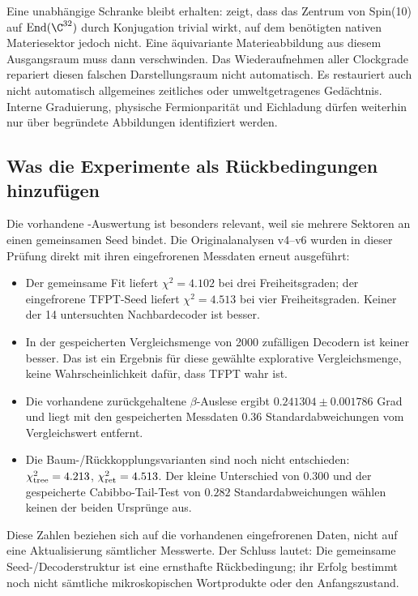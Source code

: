Eine unabhängige Schranke bleibt erhalten:  zeigt, dass das Zentrum von Spin(10) auf $\operatorname{End}(\C^{32})$ durch Konjugation trivial wirkt, auf dem benötigten nativen Materiesektor jedoch nicht. Eine äquivariante Materieabbildung aus diesem Ausgangsraum muss dann verschwinden. Das Wiederaufnehmen aller Clockgrade repariert diesen falschen Darstellungsraum nicht automatisch. Es restauriert auch nicht automatisch allgemeines zeitliches oder umweltgetragenes Gedächtnis. Interne Graduierung, physische Fermionparität und Eichladung dürfen weiterhin nur über begründete Abbildungen identifiziert werden.

\subsection*{Was die Experimente als Rückbedingungen hinzufügen}
Die vorhandene -Auswertung ist besonders relevant, weil sie mehrere Sektoren an einen gemeinsamen Seed bindet. Die Originalanalysen v4--v6 wurden in dieser Prüfung direkt mit ihren eingefrorenen Messdaten erneut ausgeführt:
\begin{itemize}
\item Der gemeinsame Fit liefert $\chi^2=4.102$ bei drei Freiheitsgraden; der eingefrorene TFPT-Seed liefert $\chi^2=4.513$ bei vier Freiheitsgraden. Keiner der 14 untersuchten Nachbardecoder ist besser.
\item In der gespeicherten Vergleichsmenge von 2000 zufälligen Decodern ist keiner besser. Das ist ein Ergebnis für diese gewählte explorative Vergleichsmenge, keine Wahrscheinlichkeit dafür, dass TFPT wahr ist.
\item Die vorhandene zurückgehaltene $\beta$-Auslese ergibt $0.241304\pm0.001786$ Grad und liegt mit den gespeicherten Messdaten $0.36$ Standardabweichungen vom Vergleichswert entfernt.
\item Die Baum-/Rückkopplungsvarianten sind noch nicht entschieden: $\chi^2_{\rm tree}=4.213$, $\chi^2_{\rm ret}=4.513$. Der kleine Unterschied von $0.300$ und der gespeicherte Cabibbo-Tail-Test von $0.282$ Standardabweichungen wählen keinen der beiden Ursprünge aus.
\end{itemize}
Diese Zahlen beziehen sich auf die vorhandenen eingefrorenen Daten, nicht auf eine Aktualisierung sämtlicher Messwerte. Der Schluss lautet: Die gemeinsame Seed-/Decoderstruktur ist eine ernsthafte Rückbedingung; ihr Erfolg bestimmt noch nicht sämtliche mikroskopischen Wortprodukte oder den Anfangszustand.

